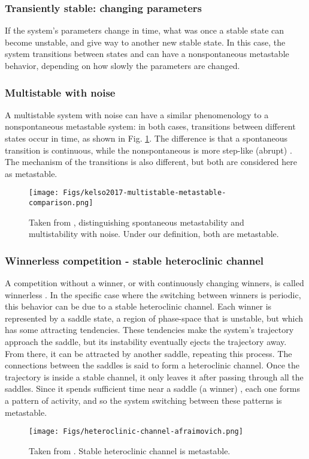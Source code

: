 \documentclass[preprint,superscriptaddress,showpacs,amsmath,amssymb,aps,pre,floatfix]{revtex4-1}
\theoremstyle{definition}
\begin{document}
\subsubsection{Transiently stable: changing parameters}
If the system's parameters change in time, what was once a stable state can become unstable, and give way to another new stable state. In this case, the system transitions between states and can have a nonspontaneous metastable behavior, depending on how slowly the parameters are changed. 


\subsubsection{Multistable with noise}
A multistable system with noise can have a similar phenomenology to a nonspontaneous metastable system: in both cases, transitions between different states occur in time, as shown in Fig. \ref{fig:kelsomulti}. The difference is that a spontaneous transition is continuous, while the nonspontaneous is more step-like (abrupt) \cite{kelso_2017}. The mechanism of the transitions is also different, but both are considered here as metastable.
%
\begin{figure}[H]
    \centering
    \texttt{[image: Figs/kelso2017-multistable-metastable-comparison.png]}
    \caption{Taken from \cite{kelso_2017}, distinguishing spontaneous metastability and multistability with noise. Under our definition, both are metastable.}
    \label{fig:kelsomulti}
\end{figure}


\subsubsection{Winnerless competition - stable heteroclinic channel}
A competition without a winner, or with continuously changing winners, is called winnerless \cite{afraimovich_2010}. In the specific case where the switching between winners is periodic, this behavior can be due to a stable heteroclinic channel. Each winner is represented by a saddle state, a region of phase-space that is unstable, but which has some attracting tendencies. These tendencies make the system's trajectory approach the saddle, but its instability eventually ejects the trajectory away. From there, it can be attracted by another saddle, repeating this process. The connections between the saddles is said to form a heteroclinic channel. Once the trajectory is inside a stable channel, it only leaves it after passing through all the saddles. Since it spends sufficient time near a saddle (a winner) \cite{beimgraben_2015}, each one forms a pattern of activity, and so the system switching between these patterns is metastable.
%
\begin{figure}[H]
    \centering
    \texttt{[image: Figs/heteroclinic-channel-afraimovich.png]}
    \caption{Taken from \cite{rabinovich_2018}. Stable heteroclinic channel is metastable.}
    \label{fig:my_label}
\end{figure}
\end{document}
